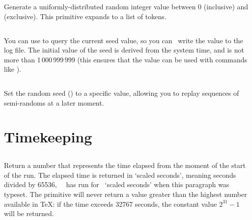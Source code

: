\documentclass{pdftexmanual}
\begin{document}
Generate a uniformly-distributed random integer value between 0
(inclusive) and  (exclusive). This primitive expands
to a list of tokens. 

\subsection{}

You can use  to query the current seed value, so you
can \eg\ write the value to the log file. The initial value of the seed
is derived from the system time, and is not more than 1\,000\,999\,999
(this ensures that the value can be used with commands like ).

\subsection{}

Set the random seed () to a specific value,
allowing you to replay sequences of semi-randoms at a later moment.

\section{Timekeeping}

\subsection{}

Return a number that represents the time elapsed from the moment of the
start of the run. The elapsed time is returned in `scaled seconds',
meaning seconds divided by 65536, \eg\ \PDFTEX\ has run for
\the\pdfelapsedtime\ `scaled seconds' when this paragraph was typeset.
The primitive will never return a value greater than the highest number
available in \TeX: if the time exceeds 32767 seconds, the constant value
$2^{31}-1$ will be returned. 

\subsection{}
\end{document}
